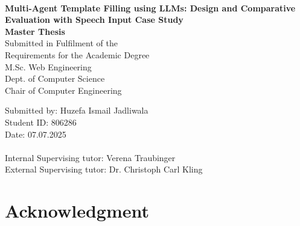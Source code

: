 \documentclass[a4paper, 12pt, oneside, BCOR1cm, toc=chapterentrywithdots]{scrbook}
\begin{document}
\frontmatter

\begin{titlepage}
  {
    \begin{center}
        \\
    \end{center}
    \vspace{0.5cm}
  }
  \begin{center}
    \LARGE{\textbf{Multi-Agent Template Filling using LLMs: Design and Comparative Evaluation with Speech Input Case Study}}\\
    \vspace{1cm}
    \Large{\textbf{Master Thesis}}\\ 
    \vspace{0.5cm}
    Submitted in Fulfilment of the\\
    Requirements for the Academic Degree\\
    M.Sc. Web Engineering\\
    \vspace{0.5cm}
    Dept. of Computer Science\\
    Chair of Computer Engineering
  \end{center}
  \vspace{1cm}
  Submitted by: Huzefa Ismail Jadliwala\\
  Student ID: 806286\\
  Date: 07.07.2025\\
  \vspace{0.3cm}\\
  Internal Supervising tutor: Verena Traubinger \\
  External Supervising tutor: Dr. Christoph Carl Kling \\
\end{titlepage}



\chapter*{Acknowledgment}

\end{document}
